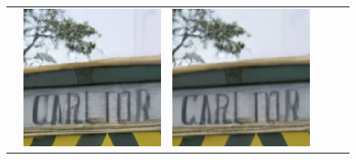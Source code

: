 \begin{figure}[!ht]
    \scriptsize
    \centering
    \def\xwidth{0.12\linewidth}
    \setlength{\tabcolsep}{1pt}
    \begin{tabular}[t]{c c c c c c}
    &
    \includegraphics[width=\xwidth]{cp2/figures/sr/scaling_sr_c96_2.png} &
    \includegraphics[width=\xwidth]{cp2/figures/sr/scaling_sr_c128_2.png} &

\end{tabular}
\end{figure}
